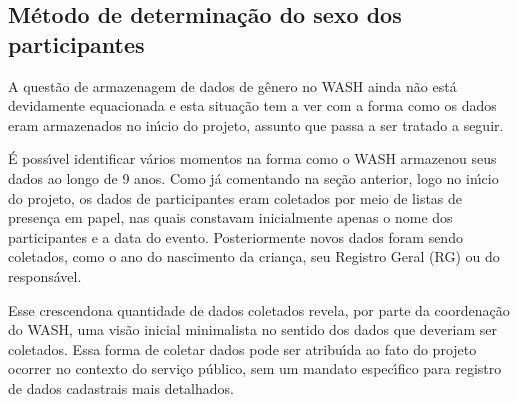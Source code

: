 \documentclass[
12pt,		%
openright,	%
twoside,  %
a4paper,			%
chapter=TITLE,		%
english,			%
french,				%
spanish,			%
brazil				%
]{USPSC-classe/USPSC}
\begin{document}
\subsection[M\'etodo de determina\c{c}\~ao do sexo dos participantes]{M\'etodo de determina\c{c}\~ao do sexo dos participantes}\label{M\'etodo de determina\c{c}\~ao do sexo dos participantes}
A quest\~ao de armazenagem de dados de g\^enero no WASH ainda n\~ao est\'a devidamente equacionada e esta situa\c{c}\~ao tem a ver com a forma como os dados eram armazenados no in\'{\i}cio do projeto, assunto que passa a ser tratado a seguir.

















\'E poss\'{\i}vel identificar v\'arios momentos na forma como o WASH armazenou seus dados ao longo de 9 anos. Como j\'a comentando na se\c{c}\~ao anterior, logo no in\'{\i}cio do projeto, os dados de participantes eram coletados por meio de listas de presen\c{c}a em papel, nas quais constavam inicialmente apenas o nome dos participantes e a data do evento. Posteriormente novos dados foram sendo coletados, como o ano do nascimento da crian\c{c}a, seu Registro Geral (RG) ou do respons\'avel.

















Esse \textquotedbl crescendo\textquotedbl  na quantidade de dados coletados revela, por parte da coordena\c{c}\~ao do WASH, uma vis\~ao inicial minimalista no sentido dos dados que deveriam ser coletados. Essa forma de coletar dados pode ser atribu\'{\i}da ao fato do projeto ocorrer no contexto do servi\c{c}o p\'ublico, sem um mandato espec\'{\i}fico para registro de dados cadastrais mais detalhados.
\end{document}

